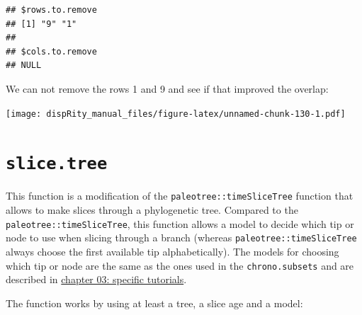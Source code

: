 \documentclass[]{book}
\newenvironment{Shaded}{\begin{snugshade}}{\end{snugshade}}
\newcommand{\DataTypeTok}[1]{\textcolor[rgb]{0.13,0.29,0.53}{#1}}
\newcommand{\KeywordTok}[1]{\textcolor[rgb]{0.13,0.29,0.53}{\textbf{#1}}}
\newcommand{\NormalTok}[1]{#1}
\newcommand{\OperatorTok}[1]{\textcolor[rgb]{0.81,0.36,0.00}{\textbf{#1}}}
\newcommand{\StringTok}[1]{\textcolor[rgb]{0.31,0.60,0.02}{#1}}
\begin{document}
\begin{verbatim}
## $rows.to.remove
## [1] "9" "1"
## 
## $cols.to.remove
## NULL
\end{verbatim}

We can not remove the rows 1 and 9 and see if that improved the overlap:

\begin{Shaded}
\end{Shaded}

\texttt{[image: dispRity\_manual\_files/figure-latex/unnamed-chunk-130-1.pdf]}

\hypertarget{slice.tree}{%
\section{\texorpdfstring{\texttt{slice.tree}}{slice.tree}}\label{slice.tree}}

This function is a modification of the \texttt{paleotree::timeSliceTree} function that allows to make slices through a phylogenetic tree.
Compared to the \texttt{paleotree::timeSliceTree}, this function allows a model to decide which tip or node to use when slicing through a branch (whereas \texttt{paleotree::timeSliceTree} always choose the first available tip alphabetically).
The models for choosing which tip or node are the same as the ones used in the \texttt{chrono.subsets} and are described in \protect\hyperlink{chrono-subsets}{chapter 03: specific tutorials}.

The function works by using at least a tree, a slice age and a model:
\end{document}
